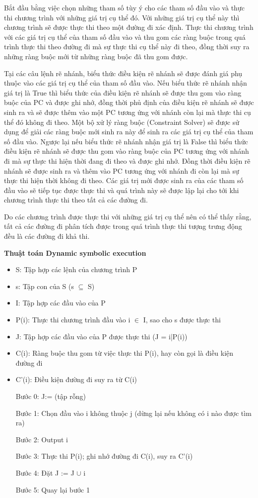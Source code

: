 	Bắt đầu bằng việc chọn những tham số tùy ý cho các tham số đầu vào và thực thi chương trình với những giá trị cụ thể đó. Với những giá trị cụ thể này thì chương trình sẽ được thực thi theo một đường đi xác định. Thực thi chương trình với các giá trị cụ thể của tham số đầu vào và thu gom các ràng buộc trong quá trình thực thi theo đường đi mà sự thực thi cụ thể này đi theo, đồng thời suy ra những ràng buộc mới từ những ràng buộc đã thu gom được.

	Tại các câu lệnh rẽ nhánh, biểu thức điều kiện rẽ nhánh sẽ được đánh giá phụ thuộc vào các giá trị cụ thể của tham số đầu vào. Nếu biểu thức rẽ nhánh nhận giá trị là True thì biểu thức của điều kiện rẽ nhánh sẽ được thu gom vào ràng buộc của PC và được ghi nhớ, đồng thời phủ định của điều kiện rẽ nhánh sẽ được sinh ra và sẽ được thêm vào một PC tương ứng với nhánh còn lại mà thực thi cụ thể đó không đi theo. Một bộ xử lý ràng buộc (Constraint Solver) sẽ được sử dụng để giải các ràng buộc mới sinh ra này để sinh ra các giá trị cụ thể của tham số đầu vào. Ngược lại nếu biểu thức rẽ nhánh nhận giá trị là False thì biểu thức điều kiện rẽ nhánh sẽ được thu gom vào ràng buộc của PC tương ứng với nhánh đi mà sự thực thi hiện thời đang đi theo và được ghi nhớ. Đồng thời điều kiện rẽ nhánh sẽ được sinh ra và thêm vào PC tương ứng với nhánh đi còn lại mà sự thực thi hiện thời không đi theo. Các giá trị mới được sinh ra của các tham số đầu vào sẽ tiếp tục được thực thi và quá trình này sẽ được lập lại cho tới khi chương trình thực thi theo tất cả các đường đi.

	Do các chương trình được thực thi với những giá trị cụ thể nên có thể thấy rằng, tất cả các đường đi phân tích được trong quá trình thực thi tượng trưng động đều là các đường đi khả thi.

	\textbf{Thuật toán Dynamic symbolic execution}
	\begin{itemize}
		\item S: Tập hợp các lệnh của chương trình P
		\item s: Tập con của S (s $\subseteq $ S)
		\item I: Tập hợp các đầu vào của P
		\item P(i): Thực thi chương trình đầu vào i $\in $ I, sao cho s được thực thi
		\item J: Tập hợp các đầu vào của P được thực thi (J = {i|P(i)})
		\item C(i): Ràng buộc thu gom từ việc thực thi P(i), hay còn gọi là điều kiện đường đi 
		\item C'(i): Điều kiện đường đi suy ra từ C(i)
		
		Bước 0: J:= {} (tập rỗng)
		
		Bước 1: Chọn đầu vào i không thuộc j (dừng lại nếu không có i nào được tìm ra)
		
		Bước 2: Output i
		
		Bước 3: Thực thi P(i); ghi nhớ đường đi C(i), suy ra C'(i)
		
		Bước 4: Đặt J := J $\cup $ i
		
		Bước 5: Quay lại bước 1
		
	\end{itemize}
	
